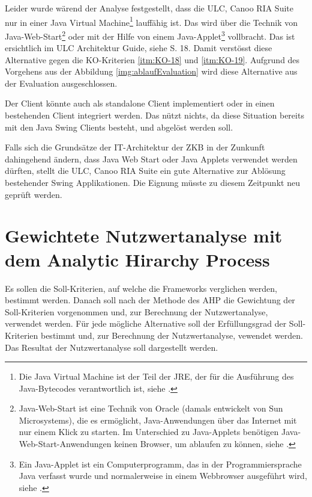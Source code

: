   Leider wurde wärend der Analyse festgestellt, dass die ULC, Canoo RIA Suite
  nur in einer Java Virtual Machine\footnote{Die Java Virtual Machine ist der
  Teil der \ac{JRE}, der für die Ausführung des Java-Bytecodes verantwortlich
  ist, siehe \cite{JavaVirtualMachine}.} lauffähig ist. Das wird über die
  Technik von Java-Web-Start\footnote{Java-Web-Start ist eine Technik von
  Oracle (damals entwickelt von Sun Microsystems), die es ermöglicht, Java-Anwendungen
  über das Internet mit nur einem Klick zu starten. Im Unterschied zu
  Java-Applets benötigen Java-Web-Start-Anwendungen keinen Browser, um ablaufen
  zu können, siehe \cite{JavaWebStart}.} oder mit der Hilfe von einem
  Java-Applet\footnote{Ein Java-Applet ist ein Computerprogramm, das in der
  Programmiersprache Java verfasst wurde und normalerweise in einem Webbrowser
  ausgeführt wird, siehe \cite{JavaApplet}.} vollbracht. Das ist ersichtlich im
  ULC Architektur Guide, siehe \cite{ULCArchitectureGuide} S. 18. Damit
  verstösst diese Alternative gegen die KO-Kriterien \ref{itm:KO-18} und
  \ref{itm:KO-19}. Aufgrund des Vorgehens aus der Abbildung
  \ref{img:ablaufEvaluation} wird diese Alternative aus der Evaluation
  ausgeschlossen.
  
  Der Client könnte auch als standalone Client implementiert oder in einen
  bestehenden Client integriert werden. Das nützt nichts, da diese Situation
  bereits mit den Java Swing Clients besteht, und abgelöst werden soll.
  
  Falls sich die Grundsätze der IT-Architektur der \ac{ZKB} in der Zunkunft
  dahingehend ändern, dass Java Web Start oder Java Applets verwendet werden
  dürften, stellt die ULC, Canoo RIA Suite ein gute Alternative zur Ablösung
  bestehender Swing Applikationen. Die Eignung müsste zu diesem Zeitpunkt neu
  geprüft werden.
    
  \section{Gewichtete Nutzwertanalyse mit dem Analytic Hirarchy Process}
  
  Es sollen die Soll-Kriterien, auf welche die Frameworks verglichen werden,
  bestimmt werden. Danach soll nach der Methode des \ac{AHP} die Gewichtung der
  Soll-Kriterien vorgenommen und, zur Berechnung der Nutzwertanalyse,
  verwendet werden. Für jede mögliche Alternative soll der Erfüllungsgrad der
  Soll-Kriterien bestimmt und, zur Berechnung der Nutzwertanalyse, vewendet
  werden. Das Resultat der Nutzwertanalyse soll dargestellt werden.
  

